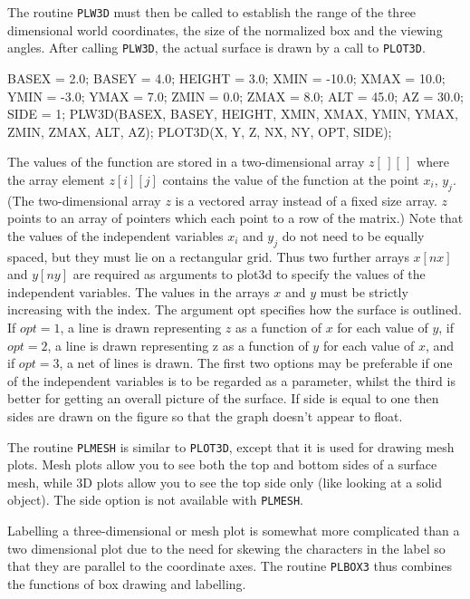 \documentclass[twoside,11pt]{starlink}
\begin{document}
The routine \texttt{PLW3D} must then be called to establish the range of
the three dimensional world coordinates, the size of the normalized
box and the viewing angles. After calling \texttt{PLW3D}, the actual
surface is drawn by a call to \texttt{PLOT3D}.

\begin{small}
\begin{terminalv}
BASEX = 2.0;
BASEY = 4.0;
HEIGHT = 3.0;
XMIN = -10.0;
XMAX = 10.0;
YMIN = -3.0;
YMAX = 7.0;
ZMIN = 0.0;
ZMAX = 8.0;
ALT = 45.0;
AZ = 30.0;
SIDE = 1;
PLW3D(BASEX, BASEY, HEIGHT, XMIN, XMAX, YMIN, YMAX, ZMIN, ZMAX, ALT, AZ);
PLOT3D(X, Y, Z, NX, NY, OPT, SIDE);
\end{terminalv}
\end{small}

The values of the function are stored in a two-dimensional array
$z[\,][\,]$ where the array element $z[i][j]$ contains the value of
the function at the point $x_{i}$, $y_{j}$. (The two-dimensional array
$z$ is a vectored array instead of a fixed size array. $z$ points to
an array of pointers which each point to a row of the matrix.) Note
that the values of the independent variables $x_{i}$ and $y_{j}$ do
not need to be equally spaced, but they must lie on a rectangular
grid. Thus two further arrays $x[nx]$ and $y[ny]$ are required as
arguments to plot3d to specify the values of the independent
variables. The values in the arrays $x$ and $y$ must be strictly
increasing with the index. The argument opt specifies how the surface
is outlined. If $opt = 1$, a line is drawn representing $z$ as a
function of $x$ for each value of $y$, if $opt = 2$, a line is drawn
representing z as a function of $y$ for each value of $x$, and if $opt
= 3$, a net of lines is drawn. The first two options may be preferable
if one of the independent variables is to be regarded as a parameter,
whilst the third is better for getting an overall picture of the
surface. If side is equal to one then sides are drawn on the figure so
that the graph doesn't appear to float.

The routine \texttt{PLMESH} is similar to \texttt{PLOT3D}, except that it is
used for drawing mesh plots. Mesh plots allow you to see both the top
and bottom sides of a surface mesh, while 3D plots allow you to see
the top side only (like looking at a solid object). The side option is
not available with \texttt{PLMESH}.

Labelling a three-dimensional or mesh plot is somewhat more
complicated than a two dimensional plot due to the need for skewing
the characters in the label so that they are parallel to the
coordinate axes. The routine \texttt{PLBOX3} thus combines the functions
of box drawing and labelling.
\end{document}
